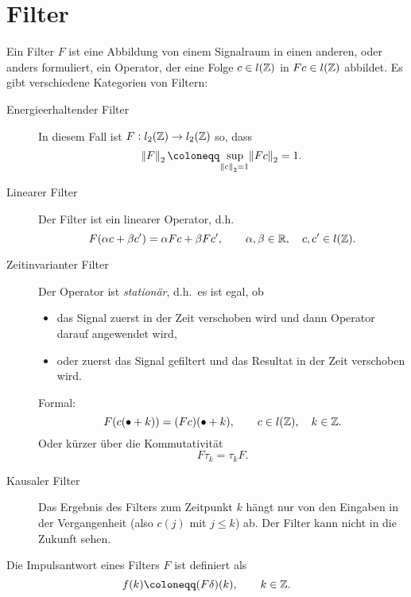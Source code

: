 \section{Filter}

\begin{definition}
Ein Filter $ F $ ist eine Abbildung von einem Signalraum in einen anderen, oder anders formuliert, 
ein Operator, der eine Folge $ c \in l(\mathbb{Z}) $ in $ Fc \in l(\mathbb{Z}) $ abbildet. Es gibt verschiedene
Kategorien von Filtern:
\begin{description}
\item [Energieerhaltender Filter]
  In diesem Fall ist $ F : l_{2}(\mathbb{Z}) \rightarrow l_{2}(\mathbb{Z}) $ so, dass
  \[
    \norm{F}_{2} \coloneqq \sup_{\norm{c}_{2} = 1} \norm{Fc}_{2} = 1.
  \]
\item [Linearer Filter]
  Der Filter ist ein linearer Operator, d.h.\
  \[
    F(\alpha c + \beta c') = \alpha Fc + \beta Fc', \qquad \alpha, \beta \in \mathbb{R}, 
                                                    \quad c, c' \in l(\mathbb{Z}).
  \]
\item [Zeitinvarianter Filter]
  Der Operator ist \emph{stationär}, d.h.\ es ist egal, ob
  \begin{itemize}
  \item das Signal zuerst in der Zeit verschoben wird und dann Operator darauf angewendet wird,
  \item oder zuerst das Signal gefiltert und das Resultat in der Zeit verschoben wird.
  \end{itemize}
  Formal:
  \[
    F(c(\bullet + k)) = (Fc)(\bullet + k), \qquad c \in l(\mathbb{Z}), \quad k \in \mathbb{Z}.
  \]
  Oder kürzer über die Kommutativität
  \[
    F\tau_{k} = \tau_{k}F.
  \]
\item [Kausaler Filter]
  Das Ergebnis des Filters zum Zeitpunkt $ k $ hängt nur von den Eingaben in der Vergangenheit
  (also $ c(j) $ mit $ j \leq k $) ab. Der Filter kann nicht in die Zukunft sehen.
\end{description}
\end{definition}

\begin{definition}[Impulsantwort]
Die Impulsantwort eines Filters $ F $ ist definiert als
\[
  f(k) \coloneqq (F \delta)(k), \qquad k \in \Z.
\]
\end{definition}

